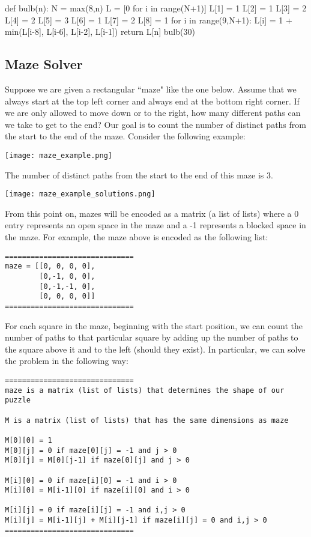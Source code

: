\documentclass{ximera}
\begin{document}
\begin{sageCell}
def bulb(n):
        N = max(8,n)
        L = [0 for i in range(N+1)]
        L[1] = 1
        L[2] = 1
        L[3] = 2
        L[4] = 2
        L[5] = 3
        L[6] = 1
        L[7] = 2
        L[8] = 1
        for i in range(9,N+1):
                L[i] = 1 + min(L[i-8], L[i-6], L[i-2], L[i-1])
        return L[n]
bulb(30)
\end{sageCell}

\subsection{Maze Solver}

Suppose we are given a rectangular ``maze" like the one below. Assume that we always start at the top left corner and always end at the bottom right corner. If we are only allowed to move down or to the right, how many different paths can we take to get to the end? Our goal is to count the number of distinct paths from the start to the end of the maze. Consider the following example:

\begin{center}
\texttt{[image: maze\_example.png]} 
\end{center}

The number of distinct paths from the start to the end of this maze is 3.

\begin{center}
\texttt{[image: maze\_example\_solutions.png]}
\end{center}

From this point on, mazes will be encoded as a matrix (a list of lists) where a 0 entry represents an open space in the maze and a -1 represents a blocked space in the maze. For example, the maze above is encoded as the following list:

\begin{verbatim}
==============================
maze = [[0, 0, 0, 0],
        [0,-1, 0, 0],
        [0,-1,-1, 0],
        [0, 0, 0, 0]]
==============================
\end{verbatim}

For each square in the maze, beginning with the start position, we can count the number of paths to that particular square by adding up the number of paths to the square above it and to the left (should they exist). In particular, we can solve the problem in the following way:
\begin{verbatim}
==============================
maze is a matrix (list of lists) that determines the shape of our puzzle

M is a matrix (list of lists) that has the same dimensions as maze

M[0][0] = 1
M[0][j] = 0 if maze[0][j] = -1 and j > 0
M[0][j] = M[0][j-1] if maze[0][j] and j > 0

M[i][0] = 0 if maze[i][0] = -1 and i > 0
M[i][0] = M[i-1][0] if maze[i][0] and i > 0

M[i][j] = 0 if maze[i][j] = -1 and i,j > 0
M[i][j] = M[i-1][j] + M[i][j-1] if maze[i][j] = 0 and i,j > 0
==============================
\end{verbatim}
\end{document}
